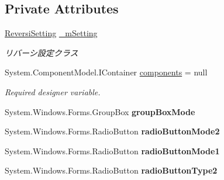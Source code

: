 \subsection*{Private Attributes}
\begin{DoxyCompactItemize}
\item 
\mbox{\label{class_reversi_form_1_1_setting_form_ac9780ac194d75fce855e51133f87467c}} 
\hyperlink{class_reversi_form_1_1_reversi_setting}{Reversi\+Setting} \hyperlink{class_reversi_form_1_1_setting_form_ac9780ac194d75fce855e51133f87467c}{\+\_\+m\+Setting}
\begin{DoxyCompactList}\small\item\em リバーシ設定クラス \end{DoxyCompactList}\item 
System.\+Component\+Model.\+I\+Container \hyperlink{class_reversi_form_1_1_setting_form_af7d6ca70cbe9baa786a42f9e3139c942}{components} = null
\begin{DoxyCompactList}\small\item\em Required designer variable. \end{DoxyCompactList}\item 
\mbox{\label{class_reversi_form_1_1_setting_form_a305bcbc910fc93ce980a7c7af418aff0}} 
System.\+Windows.\+Forms.\+Group\+Box {\bfseries group\+Box\+Mode}
\item 
\mbox{\label{class_reversi_form_1_1_setting_form_aae282ad450d30d5034bf7927c5f414c4}} 
System.\+Windows.\+Forms.\+Radio\+Button {\bfseries radio\+Button\+Mode2}
\item 
\mbox{\label{class_reversi_form_1_1_setting_form_a07cb0617436f11ef9231677f274ae9e4}} 
System.\+Windows.\+Forms.\+Radio\+Button {\bfseries radio\+Button\+Mode1}
\item 
\mbox{\label{class_reversi_form_1_1_setting_form_a32d82c76485c9246ecbe27bcedbee356}} 
System.\+Windows.\+Forms.\+Radio\+Button {\bfseries radio\+Button\+Type2}
\item 
\mbox{\label{class_reversi_form_1_1_setting_form_abf863562db386d4d86445ea8083a2b97}} 

\end{DoxyCompactItemize}
